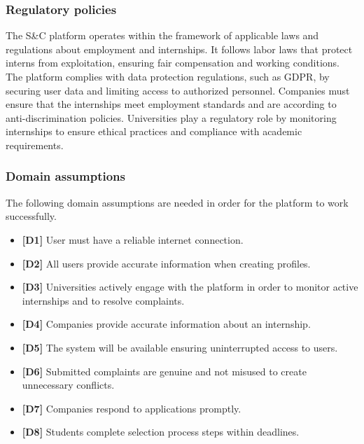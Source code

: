 \subsubsection{Regulatory policies}

The S\&C platform operates within the framework of applicable laws and regulations about employment and internships. It follows labor laws that protect interns from exploitation, ensuring fair compensation and working conditions. The platform complies with data protection regulations, such as GDPR, by securing user data and limiting access to authorized personnel. Companies must ensure that the internships meet employment standards and are according to anti-discrimination policies. Universities play a regulatory role by monitoring internships to ensure ethical practices and compliance with academic requirements.

\subsubsection{Domain assumptions}

The following domain assumptions are needed in order for the platform to work successfully. 

\begin{itemize}
    \item \textbf{[D1]} User must have a reliable internet connection.
    \item \textbf{[D2]} All users provide accurate information when creating profiles.
    \item \textbf{[D3]} Universities actively engage with the platform in order to monitor active internships and to resolve complaints.
    \item \textbf{[D4]} Companies provide accurate information about an internship.
    \item \textbf{[D5]} The system will be available ensuring uninterrupted access to users.
    \item \textbf{[D6]} Submitted complaints are genuine and not misused to create unnecessary conflicts.
    \item \textbf{[D7]} Companies respond to applications promptly.
    \item \textbf{[D8]} Students complete selection process steps within deadlines.
\end{itemize}